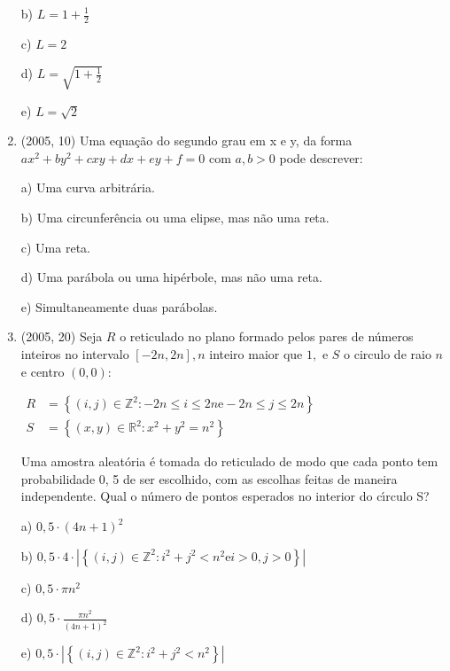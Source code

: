 \documentclass{article}
\begin{document}
\begin{enumerate}
b) $L=1+\frac{1}{2}$

c) $L=2$

d) $L=\sqrt{1+\frac{1}{2}}$

e) $L=\sqrt{2}$ \newline






\item(2005, 10) Uma equação do segundo grau em x e y, da forma $a x^{2}+b y^{2}+c x y+d x+e y+f=0$ com $a, b>0$ pode descrever:

a) Uma curva arbitrária.

b) Uma circunferência ou uma elipse, mas não uma reta.

c) Uma reta.

d) Uma parábola ou uma hipérbole, mas não uma reta.

e) Simultaneamente duas parábolas.\newline





\item(2005, 20) Seja $R$ o reticulado no plano formado pelos pares de números inteiros no intervalo
$[-2 n, 2 n], n$ inteiro maior que $1,$ e $S$ o circulo de raio $n$ e centro $(0,0) :$

$\begin{aligned} R &=\left\{(i, j) \in \mathbb{Z}^{2} :-2 n \leq i \leq 2 n \mathrm{e}-2 n \leq j \leq 2 n\right\} \\ S &=\left\{(x, y) \in \mathbb{R}^{2} : x^{2}+y^{2}=n^{2}\right\} \end{aligned}$

Uma amostra aleatória é tomada do reticulado de modo que cada ponto tem probabilidade 0, 5 de ser escolhido, com as escolhas feitas de maneira independente. Qual o número de pontos esperados no interior do cı́rculo S?

a) $0,5 \cdot(4 n+1)^{2}$

b) $0,5 \cdot 4 \cdot\left|\left\{(i, j) \in \mathbb{Z}^{2} : i^{2}+j^{2}<n^{2} \mathrm{e} i>0, j>0\right\}\right|$

c) $0,5 \cdot \pi n^{2}$

d) $0,5 \cdot \frac{\pi n^{2}}{(4 n+1)^{2}}$

e) $0,5 \cdot\left|\left\{(i, j) \in \mathbb{Z}^{2} : i^{2}+j^{2}<n^{2}\right\}\right|$ \newline









\end{enumerate}
\end{document}
